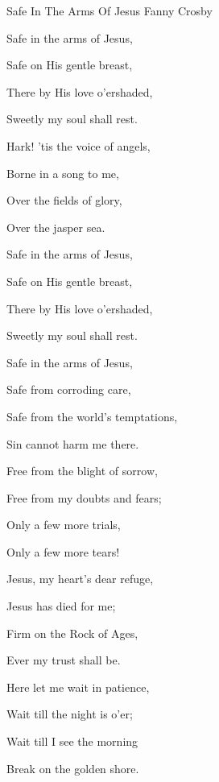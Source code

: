 \documentclass[12pt]{book}
\begin{document}
\begin{song}{Safe In The Arms Of Jesus}{}
  {\SBPubDom}
  {Fanny Crosby}
  {}
  {}

  \begin{SBVerse}
    Safe in the arms of Jesus,

    Safe on His gentle breast,

    There by His love o'ershaded,

    Sweetly my soul shall rest.

    Hark! 'tis the voice of angels,

    Borne in a song to me,

    Over the fields of glory,

    Over the jasper sea.
  \end{SBVerse}

  \begin{SBOpGroup}
    Safe in the arms of Jesus,

    Safe on His gentle breast,

    There by His love o'ershaded,

    Sweetly my soul shall rest.
  \end{SBOpGroup}

  \begin{SBVerse}
    Safe in the arms of Jesus,

    Safe from corroding care,

    Safe from the world's temptations,

    Sin cannot harm me there.

    Free from the blight of sorrow,

    Free from my doubts and fears;

    Only a few more trials,

    Only a few more tears!
  \end{SBVerse}

  \begin{SBVerse}
    Jesus, my heart's dear refuge,

    Jesus has died for me;

    Firm on the Rock of Ages,

    Ever my trust shall be.

    Here let me wait in patience,

    Wait till the night is o'er;

    Wait till I see the morning

    Break on the golden shore.
  \end{SBVerse}
\end{song}
\end{document}
